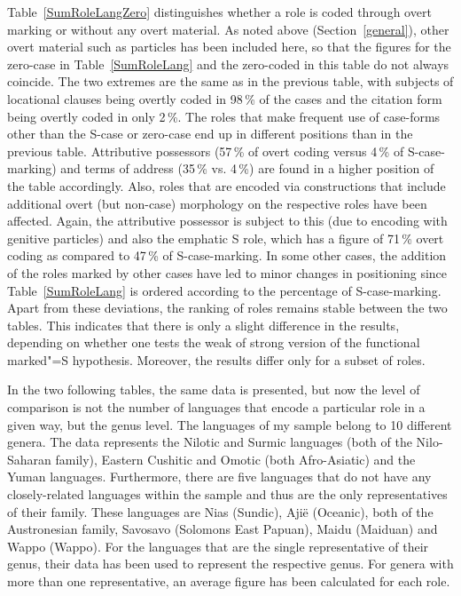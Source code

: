 Table~\ref{SumRoleLangZero} distinguishes whether a role is coded through overt marking or without any overt material. 
As noted above (Section~\ref{general}), other overt material such as particles has been included here, so that the figures for the zero-case in Table~\ref{SumRoleLang} and the zero-coded in this table do not always coincide. 
The two extremes are the same as in the previous table, with subjects of locational clauses being overtly coded in 98\,\% of the cases and the citation form being overtly coded in only 2\,\%. 
The roles that make frequent use of case-forms other than the S-case or zero-case end up in different positions than in the previous table. 
Attributive possessors (57\,\% of overt coding versus 4\,\% of S-case-marking) and terms of address (35\,\% vs. 4\,\%) are found in a higher position of the table accordingly. 
Also, roles that are encoded via constructions that include additional overt (but non-case) morphology on the respective roles have been affected. 
Again, the attributive possessor is subject to this (due to encoding with genitive particles) and also the emphatic S role, which has a figure of 71\,\% overt coding as compared to 47\,\% of S-case-marking. 
In some other cases, the addition of the roles marked by other cases have led to minor changes in positioning since Table~\ref{SumRoleLang} is ordered according to the percentage of S-case-marking.
Apart from these deviations, the ranking of roles remains stable between the two tables. 
This indicates that there is only a slight difference in the results, depending on whether one tests the weak of strong version of the functional marked"=S hypothesis. 
Moreover, the results differ only for a subset of roles.

In the two following tables, the same data is presented, but now the level of comparison is not the number of languages that encode a particular role in a given way, but the genus level. 
The languages of my sample belong to 10 different genera. 
The data represents the Nilotic and Surmic languages (both of the Nilo-Saharan family), Eastern Cushitic and Omotic (both Afro-Asiatic) and the Yuman languages. 
Furthermore, there are five languages that do not have any closely-related languages within the sample and thus are the only representatives of their family. 
These languages are Nias (Sundic), Aji\"e (Oceanic), both of the Austronesian family, Savosavo (Solomons East Papuan), Maidu (Maiduan) and Wappo (Wappo). 
For the languages that are the single representative of their genus, their data has been used to represent the respective genus. 
For genera with more than one representative, an average figure has been calculated for each role.  

